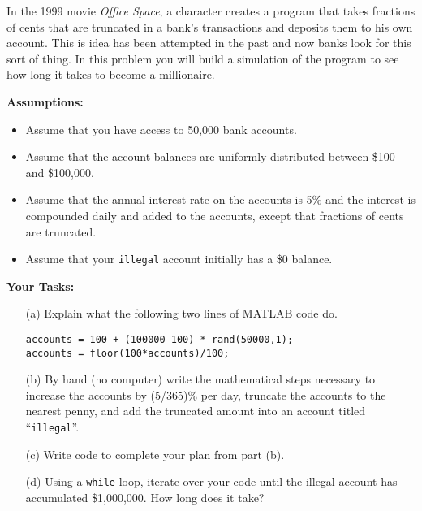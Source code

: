 \begin{problem}
    In the 1999 movie {\it Office Space}, a character creates a program that takes
    fractions of cents that are truncated in a bank's transactions and deposits them to
    his own account.  This is idea has been attempted in the past and now banks
    look for this sort of thing.  In this problem you will build a simulation of the
    program to see how long it takes to become a millionaire.  

    {\bf Assumptions:}
    \begin{itemize}
        \item Assume that you have access to 50,000 bank accounts.
        \item Assume that the account balances are uniformly distributed between
            \$100 and \$100,000.
        \item Assume that the annual interest rate on the accounts is 5\% and the interest
            is compounded daily and added to the accounts, except that fractions of cents
            are truncated.
        \item Assume that your \texttt{illegal} account initially has a \$0 balance.
    \end{itemize}

    {\bf Your Tasks:}
    \begin{enumerate}
        \item[(a)] Explain what the following two lines of MATLAB code do.
\begin{lstlisting}
accounts = 100 + (100000-100) * rand(50000,1);
accounts = floor(100*accounts)/100;
\end{lstlisting}
        \item[(b)] By hand (no computer) write the mathematical steps necessary to
            increase the accounts by (5/365)\% per day, truncate the accounts to the
            nearest penny, and add the truncated amount into an account titled
            ``\texttt{illegal}''.
        \item[(c)] Write code to complete your plan from part (b).
        \item[(d)] Using a \texttt{while} loop, iterate over your code until the illegal
            account has accumulated \$1,000,000.  How long does it take?
    \end{enumerate}
\end{problem}


